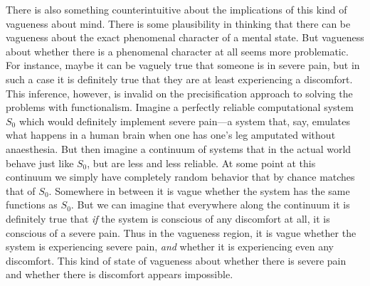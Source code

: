 There is also something counterintuitive about the implications of this kind of vagueness about mind. There is some 
plausibility in thinking that there can be vagueness about the exact phenomenal character of a mental 
state. But vagueness about whether there is a phenomenal character at all seems more problematic. For instance,
maybe it can be vaguely true that someone is in severe pain, but in such a case it is definitely true that they are 
at least experiencing a discomfort. This inference, however, is invalid on the precisification approach to solving 
the problems with functionalism. Imagine a perfectly reliable computational system $S_0$ which would definitely implement severe pain---a 
system that, say, emulates what happens in a human brain when one has one's leg amputated without anaesthesia. 
But then imagine a continuum of systems that in the actual world behave just like $S_0$, but are less and less 
reliable. At some point at this continuum we simply have completely random behavior that by chance matches that 
of $S_0$. Somewhere in between it is vague whether the system has the same functions as $S_0$. But we can imagine that 
everywhere along the continuum it is definitely true that \textit{if} the system is conscious of any discomfort at all, it is 
conscious of a severe pain. Thus in the vagueness region, it is vague whether the system is experiencing
severe pain, \textit{and} whether it is experiencing even any discomfort. This kind of state of vagueness about whether
there is severe pain and whether there is discomfort appears impossible.

